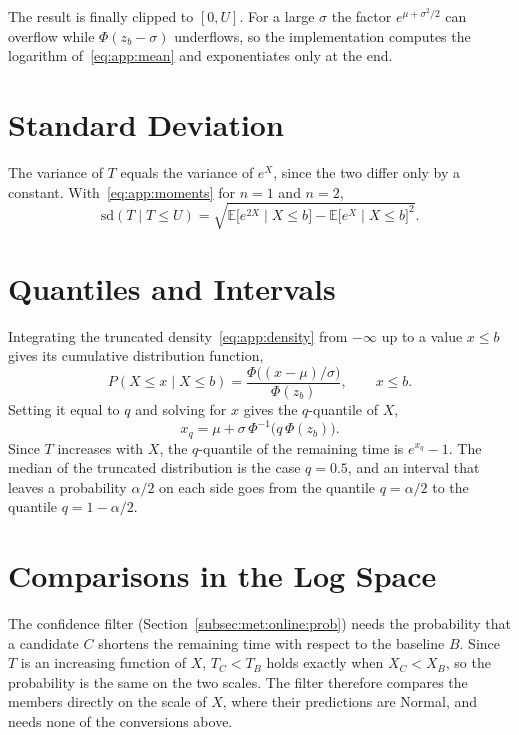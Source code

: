 The result is finally clipped to $[0, U]$. For a large $\sigma$ the factor
$e^{\mu + \sigma^2/2}$ can overflow while $\Phi(z_b - \sigma)$ underflows,
so the implementation computes the logarithm of~\eqref{eq:app:mean} and
exponentiates only at the end.

\section{Standard Deviation}
The variance of $T$ equals the variance of $e^X$, since the two differ only
by a constant. With~\eqref{eq:app:moments} for $n = 1$ and $n = 2$,
\begin{equation}
  \mathrm{sd}(T \mid T \le U)
  = \sqrt{ \mathbb{E}\bigl[ e^{2X} \mid X \le b \bigr]
         - \mathbb{E}\bigl[ e^{X} \mid X \le b \bigr]^2 } .
  \label{eq:app:sd}
\end{equation}

\section{Quantiles and Intervals}
Integrating the truncated density~\eqref{eq:app:density} from $-\infty$ up to
a value $x \le b$ gives its cumulative distribution function,
\begin{equation}
  P(X \le x \mid X \le b) = \frac{\Phi\bigl( (x - \mu)/\sigma \bigr)}{\Phi(z_b)},
  \qquad x \le b .
  \label{eq:app:cdf}
\end{equation}
Setting it equal to $q$ and solving for $x$ gives the $q$-quantile of $X$,
\begin{equation}
  x_q = \mu + \sigma\, \Phi^{-1}\bigl( q\, \Phi(z_b) \bigr) .
  \label{eq:app:quantile}
\end{equation}
Since $T$ increases with $X$, the $q$-quantile of the remaining time is
$e^{x_q} - 1$. The median of the truncated distribution is the case
$q = 0.5$, and an interval that leaves a probability $\alpha/2$ on each side
goes from the quantile $q = \alpha/2$ to the quantile $q = 1 - \alpha/2$.

\section{Comparisons in the Log Space}
The confidence filter (Section~\ref{subsec:met:online:prob}) needs the
probability that a candidate $C$ shortens the remaining time with respect to
the baseline $B$. Since $T$ is an increasing function of $X$, $T_C < T_B$
holds exactly when $X_C < X_B$, so the probability is the same on the two
scales. The filter therefore compares the members directly on the scale of
$X$, where their predictions are Normal, and needs none of the conversions
above.

